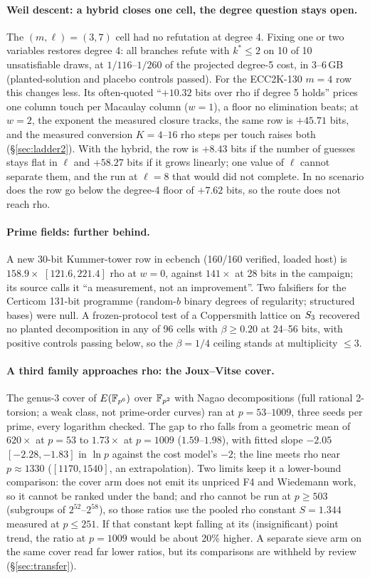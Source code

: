 \paragraph{Weil descent: a hybrid closes one cell, the degree question
stays open.} The $(m,\ell)=(3,7)$ cell had no refutation at degree 4. Fixing
one or two variables restores degree 4: all branches refute with $k^*\le2$ on
10 of 10 unsatisfiable draws, at $1/116$--$1/260$ of the projected degree-5
cost, in 3--6\,GB (planted-solution and placebo controls passed). For the
ECC2K-130 $m=4$ row this changes less. Its often-quoted ``$+10.32$ bits over
rho if degree 5 holds'' prices one column touch per Macaulay column ($w=1$),
a floor no elimination beats; at $w=2$, the exponent the measured closure
tracks, the same row is $+45.71$ bits, and the measured conversion
$K=4$--$16$ rho steps per touch raises both (\S\ref{sec:ladder2}). With the
hybrid, the row is $+8.43$ bits if the number of guesses stays flat in $\ell$
and $+58.27$ bits if it grows linearly; one value of $\ell$ cannot separate
them, and the run at $\ell=8$ that would did not complete. In no scenario does
the row go below the degree-4 floor of $+7.62$ bits, so the route does not
reach rho.

\paragraph{Prime fields: further behind.} A new 30-bit Kummer-tower row in
ecbench (160/160 verified, loaded host) is $158.9\times$ $[121.6,221.4]$ rho at
$w=0$, against $141\times$ at 28 bits in the campaign; its source calls it ``a
measurement, not an improvement''. Two falsifiers for the Certicom 131-bit
programme (random-$b$ binary degrees of regularity; structured bases) were
null. A frozen-protocol test of a Coppersmith lattice on $S_{3}$ recovered no
planted decomposition in any of 96 cells with $\beta\ge0.20$ at 24--56 bits,
with positive controls passing below, so the $\beta=1/4$ ceiling stands at
multiplicity $\le3$.

\paragraph{A third family approaches rho: the Joux--Vitse cover.} The
genus-3 cover of $E(\mathbb{F}_{p^6})$ over $\mathbb{F}_{p^2}$ with Nagao decompositions
(full rational 2-torsion; a weak class, not prime-order curves) ran at
$p=53$--$1009$, three seeds per prime, every logarithm checked. The gap to
rho falls from a geometric mean of $620\times$ at $p=53$ to $1.73\times$ at
$p=1009$ ($1.59$--$1.98$), with fitted slope $-2.05$ $[-2.28,-1.83]$ in $\ln p$
against the cost model's $-2$; the line meets rho near $p\approx1330$
($[1170,1540]$, an extrapolation). Two limits keep it a lower-bound comparison:
the cover arm does not emit its unpriced F4 and Wiedemann work, so it cannot be
ranked under the band; and rho cannot be run at $p\ge503$ (subgroups of
$2^{52}$--$2^{58}$), so those ratios use the pooled rho constant $S=1.344$
measured at $p\le251$. If that constant kept falling at its (insignificant)
point trend, the ratio at $p=1009$ would be about 20\% higher. A separate sieve arm on the same cover read far lower ratios, but its
comparisons are withheld by review (\S\ref{sec:transfer}).


